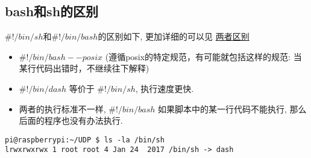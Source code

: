 \subsection{bash和sh的区别}
$\#!/bin/sh$和$\#!/bin/bash$的区别如下, 更加详细的可以见
\href{https://www.jianshu.com/p/762d4cccee7e}{两者区别}
\begin{itemize}
    \item $\#!/bin/bash --posix$ (遵循posix的特定规范，有可能就包括这样的规范: 当某行代码出错时，不继续往下解释)
    \item $\#!/bin/dash$ 等价于 $\#!/bin/sh$, 执行速度更快.
    \item 两者的执行标准不一样, $\#!/bin/bash$ 如果脚本中的某一行代码不能执行, 那么后面的程序也没有办法执行. 
\end{itemize}

\begin{lstlisting}
pi@raspberrypi:~/UDP $ ls -la /bin/sh
lrwxrwxrwx 1 root root 4 Jan 24  2017 /bin/sh -> dash
\end{lstlisting}